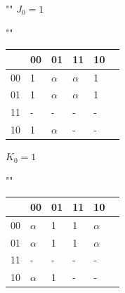 \documentclass[a4paper,12pt]{article}
\begin{document}
\begin{center}
	""\newline\newline
	$J_{0} = 1$
	
	""\newline
	\begin{tabular}{ | l | l | l | l | l | p{1cm} |}
		\hline
		\diagbox[width=5em]{$q_{3}q_{2}$}{$q_{1}q_{0}$} & 00 & 01 & 11 & 10 \\\hline
		00 & \cellcolor{blue!25} 1 & \cellcolor{blue!25} $\alpha$ & \cellcolor{blue!25} $\alpha$ & \cellcolor{blue!25} 1  \\\hline
		01 & \cellcolor{blue!25} 1 & \cellcolor{blue!25} $\alpha$ & \cellcolor{blue!25} $\alpha$ & \cellcolor{blue!25} 1  \\\hline
		11 & \cellcolor{blue!25} - & \cellcolor{blue!25} -  & \cellcolor{blue!25} - & \cellcolor{blue!25} -  \\\hline
		10 & \cellcolor{blue!25} 1 & \cellcolor{blue!25} $\alpha$  & \cellcolor{blue!25} - & \cellcolor{blue!25} -  \\
		\hline
	\end{tabular}

	\clearpage
	$K_{0} = 1$
	
	""\newline
	\begin{tabular}{ | l | l | l | l | l | p{1cm} |}
		\hline
		\diagbox[width=5em]{$q_{3}q_{2}$}{$q_{1}q_{0}$} & 00 & 01 & 11 & 10 \\\hline
		00 & \cellcolor{blue!25} $\alpha$ & \cellcolor{blue!25} 1 & \cellcolor{blue!25} 1 & \cellcolor{blue!25} $\alpha$  \\\hline
		01 & \cellcolor{blue!25} $\alpha$ & \cellcolor{blue!25} 1 & \cellcolor{blue!25} 1 & \cellcolor{blue!25} $\alpha$  \\\hline
		11 & \cellcolor{blue!25}- & \cellcolor{blue!25}-  & \cellcolor{blue!25} - & \cellcolor{blue!25} -  \\\hline
		10 & \cellcolor{blue!25} $\alpha$ & \cellcolor{blue!25}1  & \cellcolor{blue!25} - & \cellcolor{blue!25} -  \\
		\hline
	\end{tabular}
\end{center}
\end{document}
